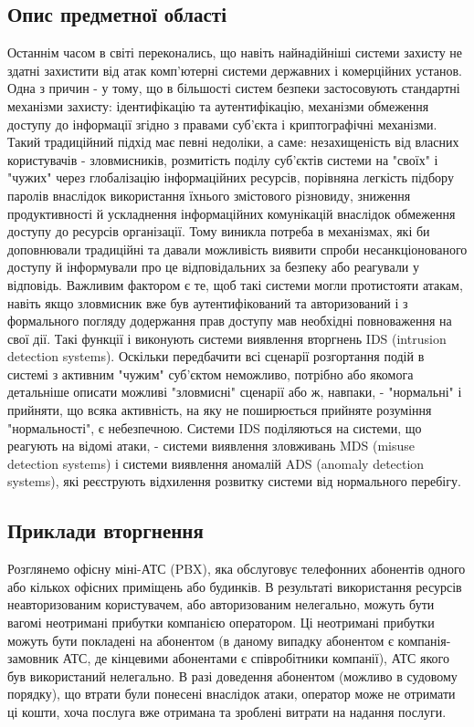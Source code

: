 \newpage
{}

\subsection{Опис предметної області}
  Останнім часом в світі переконались, що навіть найнадійніші системи захисту не здатні захистити від атак комп'ютерні системи державних і комерційних установ. Одна з причин - у тому, що в більшості систем безпеки застосовують стандартні механізми захисту: ідентифікацію та аутентифікацію, механізми обмеження доступу до інформації згідно з правами суб'єкта і криптографічні механізми. Такий традиційний підхід має певні недоліки, а саме: незахищеність від власних користувачів - зловмисників, розмитість поділу суб'єктів системи на "своїх" і "чужих" через глобалізацію інформаційних ресурсів, порівняна легкість підбору паролів внаслідок використання їхнього змістового різновиду, зниження продуктивності й ускладнення інформаційних комунікацій внаслідок обмеження доступу до ресурсів організації. Тому виникла потреба в механізмах, які би доповнювали традиційні та давали можливість виявити спроби несанкціонованого доступу й інформували про це відповідальних за безпеку або реагували у відповідь. Важливим фактором є те, щоб такі системи могли протистояти атакам, навіть якщо зловмисник вже був аутентифікований та авторизований і з формального погляду додержання прав доступу мав необхідні повноваження на свої дії. Такі функції і виконують системи виявлення вторгнень IDS (intrusion detection systems). Оскільки передбачити всі сценарії розгортання подій в системі з активним "чужим"  
  суб'єктом неможливо, потрібно або якомога детальніше описати можливі "зловмисні" сценарії або ж, навпаки, - "нормальні" і прийняти, що всяка активність, на яку не поширюється прийняте розуміння "нормальності", є небезпечною. Системи IDS поділяються на системи, що реагують на відомі атаки, - системи виявлення зловживань MDS (misuse detection systems) і системи виявлення аномалій ADS (anomaly detection systems), які реєструють відхилення розвитку системи від нормального перебігу. \TBD

\subsection{Приклади вторгнення}

	Розглянемо офісну міні-АТС (PBX), яка обслуговує телефонних абонентів одного або кількох офісних приміщень або будинків. В результаті використання ресурсів неавторизованим користувачем, або авторизованим нелегально, можуть бути вагомі неотримані прибутки компанією оператором. Ці неотримані прибутки можуть бути покладені на абонентом (в даному випадку абонентом є компанія-замовник АТС, де кінцевими абонентами є співробітники компанії), АТС якого був використаний нелегально. В разі доведення абонентом (можливо в судовому порядку), що втрати були понесені внаслідок атаки, оператор може не отримати ці кошти, хоча послуга вже отримана та зроблені витрати на надання послуги.

